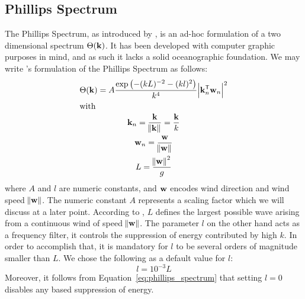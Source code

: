 \subsection{Phillips Spectrum}
\label{sec:phillips_spectrum}
%
The Phillips Spectrum, as introduced by \cite{course:simulatingocean},
is an ad-hoc formulation of a two dimensional \wavenumber spectrum $\Theta(\mathbf{k})$.
It has been developed with computer graphic purposes in mind, and as such it lacks
a solid oceanographic foundation. We may write \citeauthor{course:simulatingocean}'s
formulation of the Phillips Spectrum as follows:
%
\begin{subequations}
\begin{gather}
\label{eq:phillips_spectrum}
 \Theta(\mathbf{k}) = A\frac{\exp\left(-(kL)^{-2}-(kl)^2\right)}{k^4}\abs{\mathbf{k}_n^{\mathsf{T}}\mathbf{w}_n}^2\\
\intertext{with}
\mathbf{k}_n = \frac{\mathbf{k}}{\norm{\mathbf{k}}} = \frac{\mathbf{k}}{k}\\
\mathbf{w}_n = \frac{\mathbf{w}}{\norm{\mathbf{w}}}\\
L = \frac{\norm{\mathbf{w}}^2}{g}
\end{gather}
\end{subequations}
%
where $A$ and $l$ are numeric constants, and $\mathbf{w}$ encodes wind 
direction and wind speed $\norm{\mathbf{w}}$. The numeric constant $A$ represents 
a scaling factor which we will discuss at a later point.  According to 
\citeauthor{course:simulatingocean}, $L$ defines the largest possible wave
arising from a continuous wind of speed $\norm{\mathbf{w}}$. The parameter $l$ on 
the other hand acts as a frequency filter, it controls the suppression of energy
contributed by high \wavenumbers $k$. In order to accomplish that, it is
mandatory for $l$ to be several orders of magnitude smaller than $L$. We chose
the following as a default value for $l$:
\begin{equation}
 l = 10^{-3}L
\end{equation}
Moreover, it follows from Equation~\ref{eq:phillips_spectrum} that setting 
$l = 0$ disables any \wavenumber based suppression of energy.

